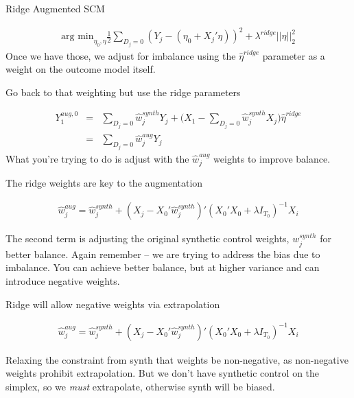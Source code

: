 \documentclass{beamer}
\begin{document}
\begin{frame}{Ridge Augmented SCM}

\begin{eqnarray*}
\textrm{arg min}_{\eta_0,\eta} \frac{1}{2} \sum_{D_j=0} (Y_j - (\eta_0 + X_j'\eta))^2 + \lambda^{ridge} || \eta ||_2^2
\end{eqnarray*}Once we have those, we adjust for imbalance using the $\widehat{\eta}^{ridge}$ parameter as a weight on the outcome model itself. 

\end{frame}




\begin{frame}{Go back to that weighting but use the ridge parameters}

\begin{eqnarray*}
Y_1^{aug,0} &=& \sum_{D_j=0} \widehat{w}_j^{synth} Y_{j} + \bigg ( X_1 - \sum_{D_j=0} \widehat{w}_j^{synth} X_j \bigg ) \widehat{\eta}^{ridge} \\
&=& \sum_{D_j=0} \widehat{w}_j^{aug}Y_j
\end{eqnarray*}What you're trying to do is adjust with the $\widehat{w}_j^{aug}$ weights to improve balance.  

\end{frame}


\begin{frame}{The ridge weights are key to the augmentation}

\begin{eqnarray*}
\widehat{w}_j^{aug} = \widehat{w}_j^{synth} + (X_j - X_0' \widehat{w}_j^{synth}) ' (X_0'X_0 + \lambda I_{T_0})^{-1}X_i
\end{eqnarray*}

The second term is adjusting the original synthetic control weights, $w_j^{synth}$ for better balance. Again remember -- we are trying to address the bias due to imbalance. You can achieve better balance, but at higher variance and can introduce negative weights. 

\end{frame}



\begin{frame}{Ridge will allow negative weights via extrapolation}

\begin{eqnarray*}
\widehat{w}_j^{aug} = \widehat{w}_j^{synth} + (X_j - X_0' \widehat{w}_j^{synth}) ' (X_0'X_0 + \lambda I_{T_0})^{-1}X_i
\end{eqnarray*}

Relaxing the constraint from synth that weights be non-negative, as non-negative weights prohibit extrapolation. But we don't have synthetic control on the simplex, so we \emph{must} extrapolate, otherwise synth will be biased.

\end{frame}
\end{document}
